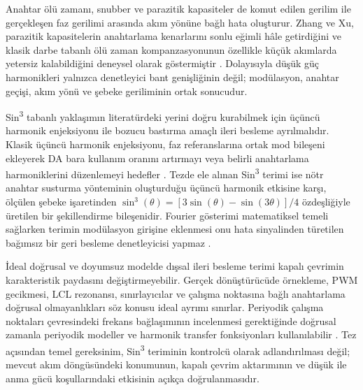 Anahtar ölü zamanı, snubber ve parazitik kapasiteler de komut edilen gerilim ile gerçekleşen faz gerilimi arasında akım yönüne bağlı hata oluşturur. Zhang ve Xu, parazitik kapasitelerin anahtarlama kenarlarını sonlu eğimli hâle getirdiğini ve klasik darbe tabanlı ölü zaman kompanzasyonunun özellikle küçük akımlarda yetersiz kalabildiğini deneysel olarak göstermiştir \citep{Zhang2014Deadtime}. Dolayısıyla düşük güç harmonikleri yalnızca denetleyici bant genişliğinin değil; modülasyon, anahtar geçişi, akım yönü ve şebeke geriliminin ortak sonucudur.

Sin\textsuperscript{3} tabanlı yaklaşımın literatürdeki yerini doğru kurabilmek için üçüncü harmonik enjeksiyonu ile bozucu bastırma amaçlı ileri besleme ayrılmalıdır. Klasik üçüncü harmonik enjeksiyonu, faz referanslarına ortak mod bileşeni ekleyerek DA bara kullanım oranını artırmayı veya belirli anahtarlama harmoniklerini düzenlemeyi hedefler \citep{Holmes2003,Aghdam2013}. Tezde ele alınan Sin\textsuperscript{3} terimi ise nötr anahtar susturma yönteminin oluşturduğu üçüncü harmonik etkisine karşı, ölçülen şebeke işaretinden $\sin^3(\theta)=[3\sin(\theta)-\sin(3\theta)]/4$ özdeşliğiyle üretilen bir şekillendirme bileşenidir. Fourier gösterimi matematiksel temeli sağlarken terimin modülasyon girişine eklenmesi onu hata sinyalinden türetilen bağımsız bir geri besleme denetleyicisi yapmaz \citep{Oppenheim1997}.

İdeal doğrusal ve doyumsuz modelde dışsal ileri besleme terimi kapalı çevrimin karakteristik paydasını değiştirmeyebilir. Gerçek dönüştürücüde örnekleme, PWM gecikmesi, LCL rezonansı, sınırlayıcılar ve çalışma noktasına bağlı anahtarlama doğrusal olmayanlıkları söz konusu ideal ayrımı sınırlar. Periyodik çalışma noktaları çevresindeki frekans bağlaşımının incelenmesi gerektiğinde doğrusal zamanla periyodik modeller ve harmonik transfer fonksiyonları kullanılabilir \citep{Wereley1991,Liao2022}. Tez açısından temel gereksinim, Sin\textsuperscript{3} teriminin kontrolcü olarak adlandırılması değil; mevcut akım döngüsündeki konumunun, kapalı çevrim aktarımının ve düşük ile anma gücü koşullarındaki etkisinin açıkça doğrulanmasıdır.


